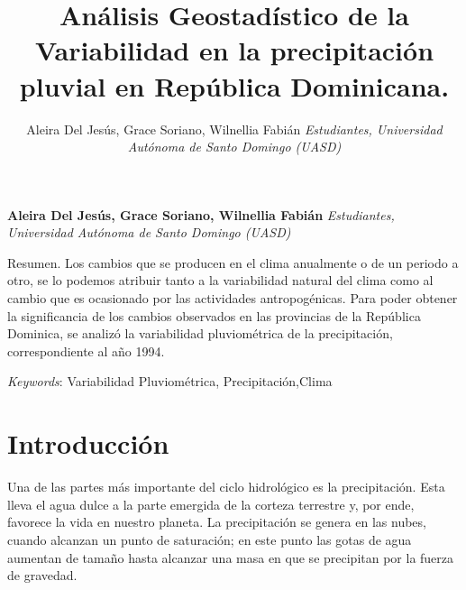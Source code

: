 \documentclass[11pt,]{article}
\title{Análisis Geostadístico de la Variabilidad en la precipitación pluvial en
República Dominicana.  }
\author{\Large Aleira Del Jesús, Grace Soriano, Wilnellia Fabián\vspace{0.05in} \newline\normalsize\emph{Estudiantes, Universidad Autónoma de Santo Domingo (UASD)}  }
\date{}
\newcommand*{\authorfont}{\fontfamily{phv}\selectfont}
\renewenvironment{abstract}
 {{%
    \setlength{\leftmargin}{0mm}
    \setlength{\rightmargin}{\leftmargin}%
  }%
  \relax}
 {\endlist}
\begin{document}
	
%

{%
\setlength{\parindent}{0pt}
\thispagestyle{plain}
{\fontsize{18}{20}\selectfont\raggedright 
\maketitle  %

}

{
   \vskip 13.5pt\relax \normalsize\fontsize{11}{12} 
\textbf{\authorfont Aleira Del Jesús, Grace Soriano, Wilnellia Fabián} \hskip 15pt \emph{\small Estudiantes, Universidad Autónoma de Santo Domingo (UASD)}   

}

}








\begin{abstract}

    \hbox{\vrule height .2pt width 39.14pc}

    \vskip 8.5pt %

\noindent Resumen. Los cambios que se producen en el clima anualmente o de un
periodo a otro, se lo podemos atribuir tanto a la variabilidad natural
del clima como al cambio que es ocasionado por las actividades
antropogénicas. Para poder obtener la significancia de los cambios
observados en las provincias de la República Dominica, se analizó la
variabilidad pluviométrica de la precipitación, correspondiente al año
1994.


\vskip 8.5pt \noindent \emph{Keywords}: Variabilidad Pluviométrica, Precipitación,Clima \par

    \hbox{\vrule height .2pt width 39.14pc}



\end{abstract}


\vskip 6.5pt


\noindent  \section{Introducción}\label{introducciuxf3n}

Una de las partes más importante del ciclo hidrológico es la
precipitación. Esta lleva el agua dulce a la parte emergida de la
corteza terrestre y, por ende, favorece la vida en nuestro planeta. La
precipitación se genera en las nubes, cuando alcanzan un punto de
saturación; en este punto las gotas de agua aumentan de tamaño hasta
alcanzar una masa en que se precipitan por la fuerza de gravedad.
\end{document}

